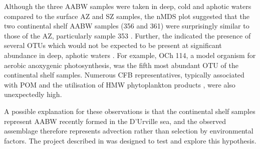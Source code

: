 Although the three \ac{AABW} samples were taken in deep, cold and aphotic waters  compared to the surface \ac{AZ} and \ac{SZ} samples, the \ac{nMDS} plot suggested that the two continental shelf \ac{AABW} samples (356 and 361) were surprisingly similar to those of the \ac{AZ}, particularly sample 353 .
Further, the indicated the presence of several \acp{OTU} which would not be expected to be present at significant abundance in deep, aphotic waters .
For example,  OCh 114, a model organism for aerobic anoxygenic photosynthesis, was the fifth most abundant \ac{OTU} of the continental shelf samples.
Numerous \ac{CFB} representatives, typically associated with \ac{POM} and the utilisation of \ac{HMW} phytoplankton products \citep[e.g.][]{Williams:2012gsa}, were also unexpectedly high.



A possible explanation for these observations is that the continental shelf samples represent \ac{AABW} recently formed in the D'Urville sea, and the observed assemblage therefore represents advection rather than selection by environmental factors.
The project described in  was designed to test and explore this hypothesis.


